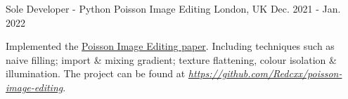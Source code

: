 \begin{cventries}
  
  \cventry
    {Sole Developer - Python} %
    {Poisson Image Editing} %
    {London, UK} %
    {Dec. 2021 - Jan. 2022} %
    {
      \begin{cvitems} %
        \item {Implemented the \href{https://www.cs.jhu.edu/~misha/Fall07/Papers/Perez03.pdf}{Poisson Image Editing paper}. Including techniques such as naive filling; import \& mixing gradient; texture flattening, colour isolation \& illumination. The project can be found at \href{https://github.com/Redcxx/poisson-image-editing}{\textit{https://github.com/Redcxx/poisson-image-editing}}.}
      \end{cvitems}
    }


  

\end{cventries}
